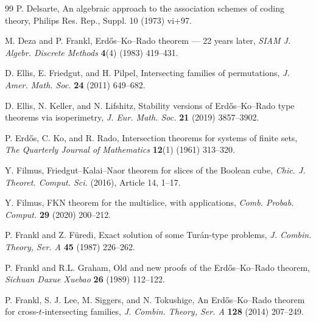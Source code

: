 \documentclass[11pt]{article}
\numberwithin{equation}{section}
\begin{document}
\begin{thebibliography}{99}
 P. Delsarte,
An algebraic approach to the association schemes of coding theory,
Philips Res. Rep., Suppl. 10 (1973) vi+97.



 M. Deza and P. Frankl,
Erd\H{o}s--Ko--Rado theorem --- 22 years later,
{\em SIAM J. Algebr. Discrete Methods} {\bf 4}(4) (1983) 419--431.



 D. Ellis, E. Friedgut, and H. Pilpel,
Intersecting families of permutations,
{\em J. Amer. Math. Soc.} {\bf 24} (2011) 649--682.

 D. Ellis, N. Keller, and N. Lifshitz,
Stability versions of Erd\H{o}s--Ko--Rado type theorems via isoperimetry,
{\em J. Eur. Math. Soc.} {\bf 21} (2019) 3857--3902.


 P. Erd\H{o}s, C. Ko, and R. Rado,
Intersection theorems for systems of finite sets,
{\em The Quarterly Journal of Mathematics} {\bf 12}(1) (1961) 313--320.



 Y. Filmus,
Friedgut--Kalai--Naor theorem for slices of the Boolean cube,
{\em Chic. J. Theoret. Comput. Sci.} (2016), Article 14, 1--17.

 Y. Filmus,
FKN theorem for the multislice, with applications,
{\em Comb. Probab. Comput.} {\bf 29} (2020) 200--212.



P. Frankl and Z. F\"uredi,
Exact solution of some Tur\'an-type problems,
{\em J. Combin. Theory, Ser. A} {\bf 45} (1987) 226--262.


 P. Frankl and R.L. Graham,
Old and new proofs of the Erd\H{o}s--Ko--Rado theorem,
{\em Sichuan Daxue Xuebao} {\bf 26} (1989) 112--122.

 P. Frankl, S. J. Lee, M. Siggers, and N. Tokushige,
An Erd\H{o}s--Ko--Rado theorem for cross-$t$-intersecting families,
{\em J. Combin. Theory, Ser. A} {\bf 128} (2014) 207--249.




\end{thebibliography}
\end{document}
